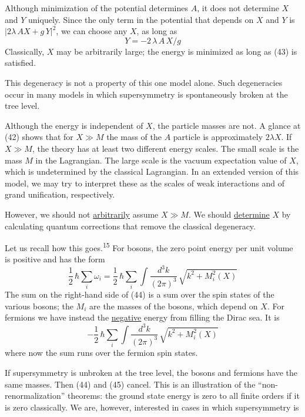Although minimization of the potential determines $A$, it does not
determine $X$ and $Y$ uniquely. Since the only term in the potential that
depends on $X$ and $Y$ is $|2 \lambda\, A X + g\, Y|^2$, we can choose any $X$, as long as
\begin{equation}
Y = -2\, \lambda\, A\, X / g
\tag{43}
\end{equation}
Classically, $X$ may be arbitrarily large; the energy is minimized as
long as (43) is satisfied.

This degeneracy is not a property of this one model alone.
Such degeneracies occur in many models in which supersymmetry is
spontaneously broken at the tree level.

Although the energy is independent of $X$, the particle masses
are not. A glance at (42) shows that for $X \gg M$ the mass of the $A$
particle is approximately $2 \lambda X$. If $X \gg M$, the theory has at least
two different energy scales. The small scale is the mass $M$ in the
Lagrangian. The large scale is the vacuum expectation value of $X$,
which is undetermined by the classical Lagrangian. In an extended
version of this model, we may try to interpret these as the scales
of weak interactions and of grand unification, respectively.

However, we should not \underline{arbitrarily} assume $X \gg M$. We should
\underline{determine} $X$ by calculating quantum corrections that remove the classical
degeneracy.

Let us recall how this goes.\textsuperscript{15} For bosons, the zero point
energy per unit volume is positive and has the form
\begin{equation}
\frac{1}{2}\,\hbar \sum_i \omega_i = \frac{1}{2}\,\hbar \sum_i \int \frac{d^3 k}{(2\pi)^3}\, \sqrt{k^2 + M_i^2(X)}
\tag{44}
\end{equation}
The sum on the right-hand side of (44) is a sum over the spin states
of the various bosons; the $M_i$ are the masses of the bosons, which
depend on $X$. For fermions we have instead the \underline{negative} energy from
filling the Dirac sea. It is
\begin{equation}
- \frac{1}{2}\,\hbar \sum_i \int \frac{d^3 k}{(2\pi)^3}\, \sqrt{k^2 + M_i^2(X)}
\tag{45}
\end{equation}
where now the sum runs over the fermion spin states.

If supersymmetry is unbroken at the tree level, the bosons and
fermions have the same masses. Then (44) and (45) cancel. This is
an illustration of the ``non-renormalization'' theorems: the ground
state energy is zero to all finite orders if it is zero classically.
We are, however, interested in cases in which supersymmetry is

